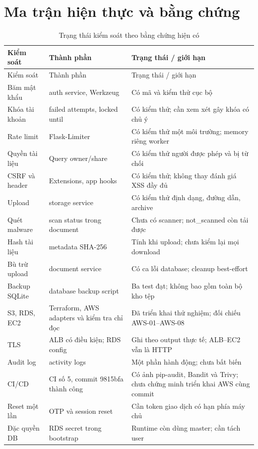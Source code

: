 \chapter{Ma trận hiện thực và bằng chứng}
{\small\begin{longtable}{P{3.2cm}P{4.8cm}P{4.7cm}}
\caption{Trạng thái kiểm soát theo bằng chứng hiện có}\\\toprule
\textbf{Kiểm soát}&\textbf{Thành phần}&\textbf{Trạng thái / giới hạn}\\\midrule\endfirsthead
\toprule Kiểm soát&Thành phần&Trạng thái / giới hạn\\\midrule\endhead
Băm mật khẩu & auth service, Werkzeug & Có mã và kiểm thử cục bộ\\
Khóa tài khoản & failed attempts, locked until & Có kiểm thử; cần xem xét gây khóa có chủ ý\\
Rate limit & Flask-Limiter & Có kiểm thử một môi trường; memory riêng worker\\
Quyền tài liệu & Query owner/share & Có kiểm thử người được phép và bị từ chối\\
CSRF và header & Extensions, app hooks & Có kiểm thử; không thay đánh giá XSS đầy đủ\\
Upload & storage service & Có kiểm thử định dạng, đường dẫn, archive\\
Quét malware & scan status trong document & Chưa có scanner; not\_scanned còn tải được\\
Hash tài liệu & metadata SHA-256 & Tính khi upload; chưa kiểm lại mọi download\\
Bù trừ upload & document service & Có ca lỗi database; cleanup best-effort\\
Backup SQLite & database backup script & Ba test đạt; không bao gồm toàn bộ kho tệp\\
S3, RDS, EC2 & Terraform, AWS adapters và kiểm tra chỉ đọc & Đã triển khai thử nghiệm; đối chiếu AWS-01--AWS-08\\
TLS & ALB có điều kiện; RDS config & Ghi theo output thực tế; ALB--EC2 vẫn là HTTP\\
Audit log & activity logs & Một phần hành động; chưa bất biến\\
CI/CD & CI số 5, commit 9815bfa thành công & Có ảnh pip-audit, Bandit và Trivy; chưa chứng minh triển khai AWS cùng commit\\
Reset một lần & OTP và session reset & Cần token giao dịch có hạn phía máy chủ\\
Đặc quyền DB & RDS secret trong bootstrap & Runtime còn dùng master; cần tách user\\\bottomrule
\end{longtable}}

